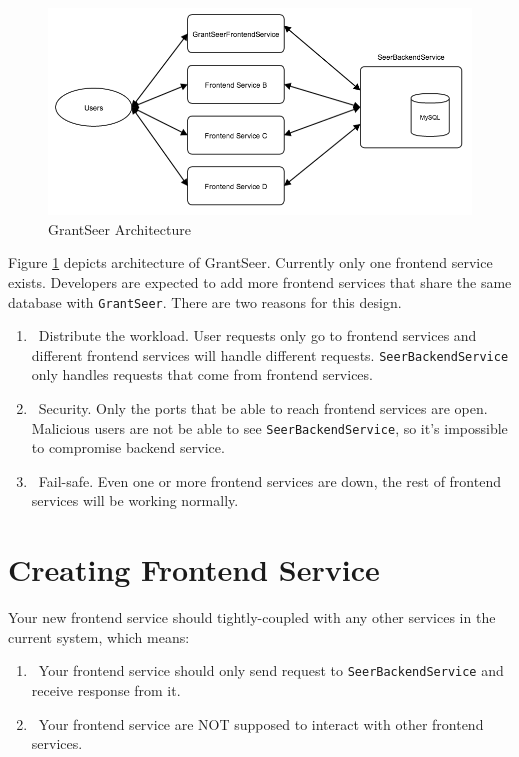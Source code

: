 \documentclass[12pt]{article}
\begin{document}
\begin{figure}[!htb]
	\caption{GrantSeer Architecture}
	\label{grantseer_architecture}
	\centering
	\includegraphics[width=\textwidth]{GrantSeerArchitecture.png}
\end{figure}

Figure \ref{grantseer_architecture} depicts architecture of GrantSeer. Currently only one frontend service exists. Developers are expected to add more frontend services that share the same database with \texttt{GrantSeer}. There are two reasons for this design.
\begin{enumerate}
	\item\ Distribute the workload. User requests only go to frontend services and different frontend services will handle different requests. \texttt{SeerBackendService} only handles requests that come from frontend services.
	\item\ Security. Only the ports that be able to reach frontend services are open. Malicious users are not be able to see \texttt{SeerBackendService}, so it's impossible to compromise backend service.
	\item\ Fail-safe. Even one or more frontend services are down, the rest of frontend services will be working normally.
\end{enumerate}

\section{Creating Frontend Service}
Your new frontend service should tightly-coupled with any other services in the current system, which means:
\begin{enumerate}
	\item\ Your frontend service should only send request to \texttt{SeerBackendService} and receive response from it.
	\item\ Your frontend service are NOT supposed to interact with other frontend services.
\end{enumerate}
\end{document}
